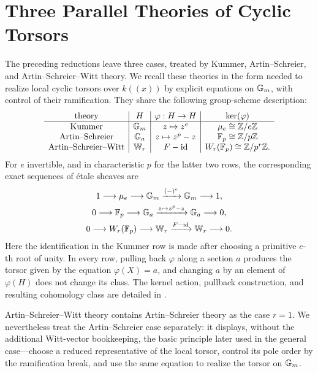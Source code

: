 \section{Three Parallel Theories of Cyclic Torsors}
\label{section:cyclic_extension_theories}
\providecommand{\bW}{\mathbb{W}}

The preceding reductions leave three cases, treated by Kummer,
Artin--Schreier, and Artin--Schreier--Witt theory. We recall these theories in
the form needed to realize local cyclic torsors over $k((x))$ by explicit
equations on $\mathbb{G}_m$, with control of their ramification. They share the
following group-scheme description:
\[
\begin{array}{c|c|c|c}
\text{theory}&H&\varphi:H\to H&\ker(\varphi)\\ \hline
\text{Kummer}&\bG_m&z\mapsto z^e&\mu_e\cong\Z/e\Z\\
\text{Artin--Schreier}&\bG_a&z\mapsto z^p-z&\F_p\cong\Z/p\Z\\
\text{Artin--Schreier--Witt}&\bW_r&F-\mathrm{id}
    &W_r(\F_p)\cong\Z/p^r\Z.
\end{array}
\]
For $e$ invertible, and in characteristic $p$ for the latter two rows,
the corresponding exact sequences of \'etale sheaves are
\[
\begin{gathered}
1\longrightarrow\mu_e\longrightarrow\bG_m
\xrightarrow{(-)^e}\bG_m\longrightarrow1,\\
0\longrightarrow\F_p\longrightarrow\bG_a
\xrightarrow{z\mapsto z^p-z}\bG_a\longrightarrow0,\\
0\longrightarrow W_r(\F_p)\longrightarrow\bW_r
\xrightarrow{F-\mathrm{id}}\bW_r\longrightarrow0.
\end{gathered}
\]
Here the identification in the Kummer row is made after choosing a primitive
$e$-th root of unity. In every row, pulling back $\varphi$ along a section $a$
produces the torsor given by the equation $\varphi(X)=a$, and changing $a$ by
an element of $\varphi(H)$ does not change its class. The kernel action,
pullback construction, and resulting cohomology class are detailed in
.

Artin--Schreier--Witt theory contains Artin--Schreier theory as the case
$r=1$. We nevertheless treat the Artin--Schreier case separately: it displays,
without the additional Witt-vector bookkeeping, the basic principle later
used in the general case---choose a reduced representative of the local
torsor, control its pole order by the ramification break, and use the same
equation to realize the torsor on $\mathbb{G}_m$.

